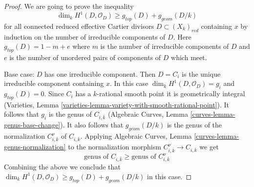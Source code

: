 \documentclass{stacks-project}
\theoremstyle{plain}
\theoremstyle{definition}
\theoremstyle{remark}
\numberwithin{equation}{subsection}
\begin{document}
\begin{proof}
We are going to prove the inequality
$$
\dim_k H^1(D, \mathcal{O}_D) \geq g_{top}(D) + g_{geom}(D/k)
$$
for all connected reduced effective Cartier divisors
$D \subset (X_k)_{red}$ containing $x$ by induction
on the number of irreducible components of $D$.
Here $g_{top}(D) = 1 - m + e$ where $m$ is the number of
irreducible components of $D$ and $e$ is the number of
unordered pairs of components of $D$ which meet.

\medskip\noindent
Base case: $D$ has one irreducible component. Then $D = C_i$
is the unique irreducible component containing $x$.
In this case $\dim_k H^1(D, \mathcal{O}_D) = g_i$
and $g_{top}(D) = 0$. Since $C_i$ has a $k$-rational smooth point
it is geometrically integral
(Varieties, Lemma \ref{varieties-lemma-variety-with-smooth-rational-point}).
It follows that $g_i$ is the genus of $C_{i, \overline{k}}$
(Algebraic Curves, Lemma \ref{curves-lemma-genus-base-change}).
It also follows that $g_{geom}(D/k)$ is the genus of the normalization
$C_{i, \overline{k}}^\nu$ of $C_{i, \overline{k}}$. Applying
Algebraic Curves, Lemma \ref{curves-lemma-genus-normalization}
to the normalization morphism $C_{i, \overline{k}}^\nu \to C_{i, \overline{k}}$
we get
\begin{equation}
\label{equation-genus-change-special-component}
\text{genus of }C_{i, \overline{k}} \geq
\text{genus of }C_{i, \overline{k}}^\nu
\end{equation}
Combining the above we conclude that
$\dim_k H^1(D, \mathcal{O}_D) \geq g_{top}(D) + g_{geom}(D/k)$
in this case.


\end{proof}
\end{document}
